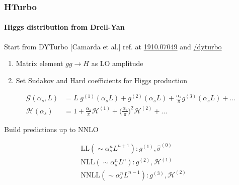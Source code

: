 \documentclass[aspectratio=43]{beamer}
\begin{document}
\begin{frame}

	\frametitle{HTurbo}
	\framesubtitle{Higgs distribution from Drell-Yan}
	Start from DYTurbo [Camarda et al.] ref. at {\color{blue} \href{https://arxiv.org/abs/1910.07049}{1910.07049}} and {\color{blue} \href{https://dyturbo.hepforge.org/}{/dyturbo}}
	\begin{enumerate}
		\item Matrix element $gg \rightarrow H$ as LO amplitude
		\item Set Sudakov and Hard coefficients for Higgs production
	\end{enumerate}
	
	\begin{align}
		\mathcal{G}(\alpha_{s}, L) &= L\;g^{(1)}(\alpha_{s}L) + g^{(2)}(\alpha_{s}L) + \frac{\alpha_{s}}{\pi}g^{(3)}(\alpha_{s}L) + ... \nonumber \\
		\mathcal{H}(\alpha_{s}) &= 1 + \frac{\alpha_{s}}{\pi}\mathcal{H}^{(1)} + \Big(\frac{\alpha_{s}}{\pi}\Big)^{2}\mathcal{H}^{(2)} + ...  \nonumber
	\end{align}
	
	Build predictions up to NNLO
		
	\begin{align}
		&\textrm{LL} (\sim \alpha_{s}^{n}L^{n+1}): g^{(1)}, \hat{\sigma}^{(0)} \nonumber \\
		&\textrm{NLL} (\sim \alpha_{s}^{n}L^{n}): g^{(2)}, \mathcal{H}^{(1)} \nonumber \\
		&\textrm{NNLL} (\sim \alpha_{s}^{n}L^{n-1}): g^{(3)}, \mathcal{H}^{(2)} \nonumber
	\end{align}

\end{frame}
\end{document}
